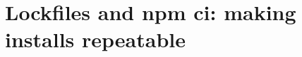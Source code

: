 \chapter{Lockfiles and npm ci: making installs repeatable}
\label{ch:lockfiles-and-npm-ci-making-installs}

